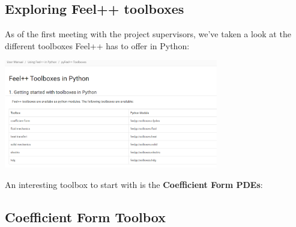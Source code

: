 \documentclass[12pt]{article}
\begin{document}
\subsection{Exploring Feel++ toolboxes}

As of the first meeting with the project supervisors, we've taken a look at the different toolboxes Feel++ has to offer in Python:
\begin{frame}{}
    \begin{center}
        \includegraphics[width=0.7\textwidth]{images/pyfeelpptoolboxes.png}
    \end{center}
\end{frame}

An interesting toolbox to start with is the \textbf{Coefficient Form PDEs}:

\subsection{Coefficient Form Toolbox}
\end{document}
